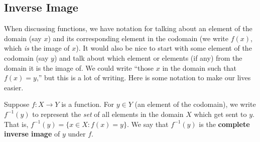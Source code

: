 \documentclass[10pt,]{book}
\newcommand{\terminology}[1]{\textbf{#1}}
\theoremstyle{plain}
\theoremstyle{definition}
\theoremstyle{definition}
\theoremstyle{definition}
\numberwithin{equation}{section}
\def\inv{^{-1}}
\def\st{:}
\begin{document}
\subsection[Inverse Image]{Inverse Image}\label{subsection-9}

      When discussing functions, we have notation for talking about an element of the domain (say \(x\)) and its corresponding element in the codomain (we write \(f(x)\), which \emph{is} the image of \(x\)). It would also be nice to start with some element of the codomain (say \(y\)) and talk about which element or elements (if any) from the domain it is the image of. We could write ``those \(x\) in the domain such that \(f(x) = y\),'' but this is a lot of writing. Here is some notation to make our lives easier.
\par

      Suppose \(f:X \to Y\) is a function. For \(y \in Y\) (an element of the codomain), we write
      \(f\inv(y)\)\label{notation-4}
 to represent the \emph{set} of all elements in the domain \(X\) which get sent to \(y\). That is, \(f\inv(y) = \{x \in X \st f(x) = y\}\). We say that \(f\inv(y)\) is the
      \terminology{complete inverse image} of \(y\) under \(f\).
\par
\end{document}
